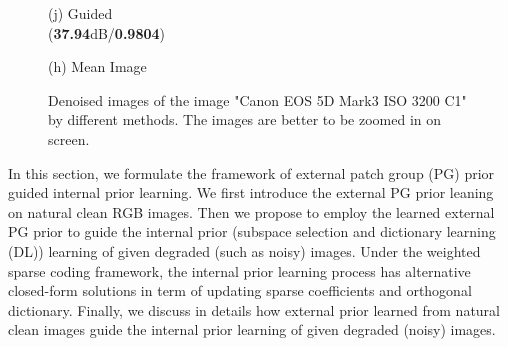 \documentclass[10pt,twocolumn,letterpaper]{article}
\begin{document}
\begin{figure}
{\begin{minipage}[t]{0.195\textwidth}
{\footnotesize (j) Guided \\ (\textbf{37.94}dB/\textbf{0.9804})}
\end{minipage}
\begin{minipage}[t]{0.195\textwidth}
\centering
{}
{\footnotesize (h) Mean Image }
\end{minipage}
}
\caption{Denoised images of the image "Canon EOS 5D Mark3 ISO 3200 C1" by different methods. The images are better to be zoomed in on screen.}\vspace{-4mm}
\end{figure}


In this section, we formulate the framework of external patch group (PG) prior guided internal prior learning. We first introduce the external PG prior leaning on natural clean RGB images. Then we propose to employ the learned external PG prior to guide the internal prior (subspace selection and dictionary learning (DL)) learning of given degraded (such as noisy) images. Under the weighted sparse coding framework, the internal prior learning process has alternative closed-form solutions in term of updating sparse coefficients and orthogonal dictionary. Finally, we discuss in details how external prior learned from natural clean images guide the internal prior learning of given degraded (noisy) images.
\end{document}
